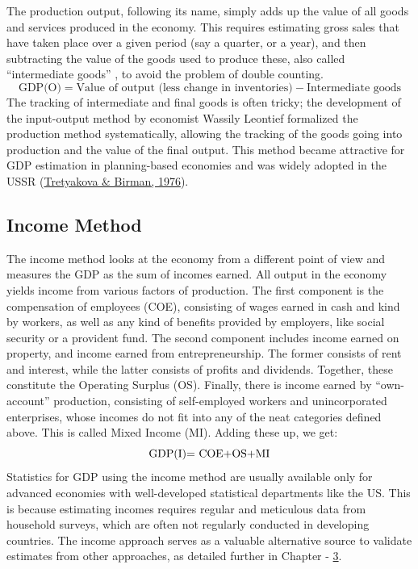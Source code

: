 \documentclass[12pt,nobind, a4paper]{reedthesis}
\begin{document}
 The production output, following its name, simply adds up the value of all goods and services produced in the economy. This requires estimating gross sales that have taken place over a given period (say a quarter, or a year), and then subtracting the value of the goods used to produce these, also called ``intermediate goods'' , to avoid the problem of double counting.
 \begin{equation}
 \text{GDP(O)}= \text{Value of output (less change in inventories)} - \text{Intermediate goods}
 \end{equation}
 The tracking of intermediate and final goods is often tricky; the development of the input-output method by economist Wassily Leontief formalized the production method systematically, allowing the tracking of the goods going into production and the value of the final output. This method became attractive for GDP estimation in planning-based economies and was widely adopted in the USSR (\protect\hyperlink{ref-tretyakova_input-output_1976}{Tretyakova \& Birman, 1976}).

 \hypertarget{income-method}{%
 \subsection{Income Method}\label{income-method}}

 The income method looks at the economy from a different point of view and measures the GDP as the sum of incomes earned. All output in the economy yields income from various factors of production. The first component is the compensation of employees (COE), consisting of wages earned in cash and kind by workers, as well as any kind of benefits provided by employers, like social security or a provident fund. The second component includes income earned on property, and income earned from entrepreneurship. The former consists of rent and interest, while the latter consists of profits and dividends. Together, these constitute the Operating Surplus (OS). Finally, there is income earned by ``own-account'' production, consisting of self-employed workers and unincorporated enterprises, whose incomes do not fit into any of the neat categories defined above. This is called Mixed Income (MI). Adding these up, we get:
 \begin{equation}
 \text{GDP(I)= \text{COE}+\text{OS}+\text{MI}}
 \end{equation}
 Statistics for GDP using the income method are usually available only for advanced economies with well-developed statistical departments like the US. This is because estimating incomes requires regular and meticulous data from household surveys, which are often not regularly conducted in developing countries. The income approach serves as a valuable alternative source to validate estimates from other approaches, as detailed further in Chapter - \protect\hyperlink{ch3}{3}.
\end{document}
